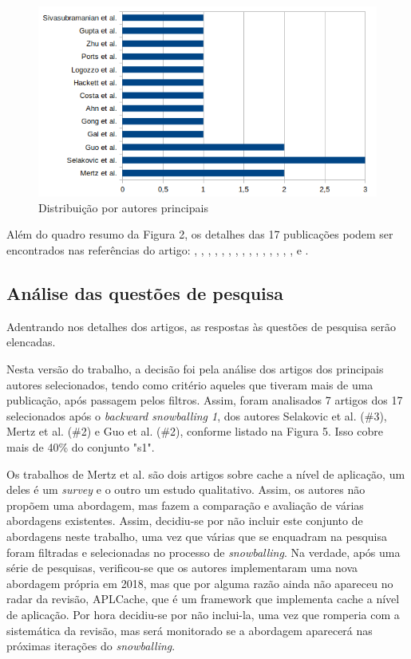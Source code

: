 \documentclass[sigconf]{acmart}
\begin{document}
\begin{figure}[H]
  \centering
  \includegraphics[width=\linewidth]{authors}
  \caption{Distribuição por autores principais}
\end{figure}

Além do quadro resumo da Figura 2, os detalhes das 17 publicações podem ser encontrados nas referências do artigo: \cite{guo2011using}, \cite{selakovic2016performance}, \cite{selakovic2017actionable}, \cite{mertz2017understanding}, \cite{gal2009trace}, \cite{guo2010towards}, \cite{logozzo2010rata}, \cite{hackett2012fast}, \cite{costa2013just}, \cite{ahn2014improving}, \cite{selakovic2015poster}, \cite{gong2015jitprof}, \cite{sivasubramanian2007analysis}, \cite{gupta2011trigger}, \cite{zhu2012saving}, \cite{mertz2016qualitative} e \cite{ports2010transactional}.

\subsection{Análise das questões de pesquisa}
Adentrando nos detalhes dos artigos, as respostas às questões de pesquisa serão elencadas.

Nesta versão do trabalho, a decisão foi pela análise dos artigos dos principais autores selecionados, tendo como critério aqueles que tiveram mais de uma publicação, após passagem pelos filtros. Assim, foram analisados 7 artigos dos 17 selecionados após o \textit{backward snowballing 1}, dos autores Selakovic et al. (\#3), Mertz et al. (\#2) e Guo et al. (\#2), conforme listado na Figura 5. Isso cobre mais de 40\% do conjunto "s1".

Os trabalhos de Mertz et al. são dois artigos sobre cache a nível de aplicação, um deles é um \textit{survey} e o outro um estudo qualitativo. Assim, os autores não propõem uma abordagem, mas fazem a comparação e avaliação de várias abordagens existentes. Assim, decidiu-se por não incluir este conjunto de abordagens neste trabalho, uma vez que várias que se enquadram na pesquisa foram filtradas e selecionadas no processo de \textit{snowballing}. Na verdade, após uma série de pesquisas, verificou-se que os autores implementaram uma nova abordagem própria em 2018, mas que por alguma razão ainda não apareceu no radar da revisão, APLCache, que é um framework que implementa cache a nível de aplicação. Por hora decidiu-se por não inclui-la, uma vez que romperia com a sistemática da revisão, mas será monitorado se a abordagem aparecerá nas próximas iterações do \textit{snowballing}.
\end{document}
